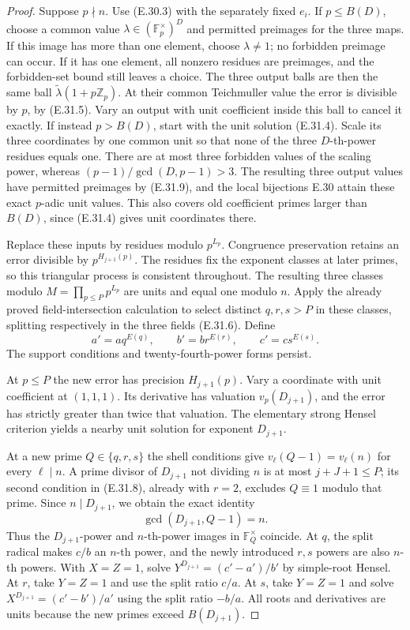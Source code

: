 \begin{proof}
Suppose $p\nmid n$.  Use (E.30.3) with the separately fixed $e_i$.
If $p\le B(D)$, choose a common value
$\lambda\in(\mathbb F_p^\times)^D$ and permitted preimages for the
three maps.  If this image has more than one element, choose
$\lambda\ne1$; no forbidden preimage can occur.  If it has one
element, all nonzero residues are preimages, and the forbidden-set
bound still leaves a choice.  The three output balls are then the same
ball $\widetilde\lambda(1+p\mathbb Z_p)$.  At their common
Teichmuller value the error is divisible by $p$, by (E.31.5).  Vary an
output with unit coefficient inside this ball to cancel it exactly.
If instead $p>B(D)$, start with the unit solution (E.31.4).  Scale its
three coordinates by one common unit so that none of the three
$D$-th-power residues equals one.  There are at most three forbidden
values of the scaling power, whereas
$(p-1)/\gcd(D,p-1)>3$.  The resulting three output values have
permitted preimages by (E.31.9), and the local bijections E.30 attain
these exact $p$-adic unit values.  This also covers old coefficient
primes larger than $B(D)$, since (E.31.4) gives unit coordinates there.

Replace these inputs by residues modulo $p^{L_p}$.  Congruence
preservation retains an error divisible by $p^{H_{j+1}(p)}$.
The residues fix the exponent classes at later primes, so this
triangular process is consistent throughout.  The resulting three
classes modulo $M=\prod_{p\le P}p^{L_p}$ are units and equal one
modulo $n$.  Apply the already proved field-intersection calculation
to select distinct $q,r,s>P$ in these classes, splitting respectively
in the three fields (E.31.6).  Define
\[
 a'=a q^{E(q)},\qquad b'=b r^{E(r)},\qquad c'=c s^{E(s)}.
 \tag{E.31.10}
\]
The support conditions and twenty-fourth-power forms persist.

At $p\le P$ the new error has precision $H_{j+1}(p)$.
Vary a coordinate with unit coefficient at $(1,1,1)$.
Its derivative has valuation $v_p(D_{j+1})$, and the error has
strictly greater than twice that valuation.  The elementary strong
Hensel criterion yields a nearby unit solution for exponent $D_{j+1}$.

At a new prime $Q\in\{q,r,s\}$ the shell conditions give
$v_\ell(Q-1)=v_\ell(n)$ for every $\ell\mid n$.  A prime divisor
of $D_{j+1}$ not dividing $n$ is at most $j+J+1\le P$; its second
condition in (E.31.8), already with $r=2$, excludes $Q\equiv1$
modulo that prime.  Since $n\mid D_{j+1}$, we obtain the exact identity
\[
                  \gcd(D_{j+1},Q-1)=n.
 \tag{E.31.11}
\]
Thus the $D_{j+1}$-power and $n$-th-power images in $\mathbb F_Q^\times$
coincide.  At $q$, the split radical makes $c/b$ an $n$-th power, and
the newly introduced $r,s$ powers are also $n$-th powers.  With
$X=Z=1$, solve $Y^{D_{j+1}}=(c'-a')/b'$ by simple-root Hensel.
At $r$, take $Y=Z=1$ and use the split ratio $c/a$.
At $s$, take $Y=Z=1$ and solve
$X^{D_{j+1}}=(c'-b')/a'$ using the split ratio $-b/a$.
All roots and derivatives are units because the new primes exceed
$B(D_{j+1})$.


\end{proof}
